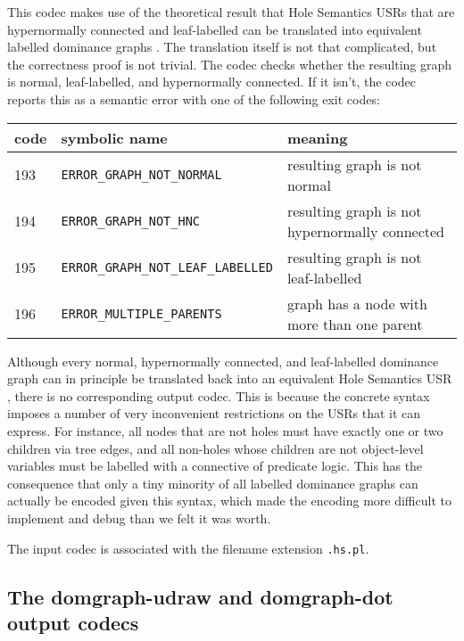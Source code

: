 This codec makes use of the theoretical result that Hole Semantics
USRs that are hypernormally connected and leaf-labelled can be
translated into equivalent labelled dominance graphs
\cite{KolNieTha03}. The translation itself is not that complicated,
but the correctness proof is not trivial. The codec checks whether the
resulting graph is normal, leaf-labelled, and hypernormally
connected. If it isn't, the codec reports this as a semantic error
with one of the following exit codes:

\begin{tabular}{lll}
code & symbolic name & meaning \\ \hline
193 &  \verb?ERROR_GRAPH_NOT_NORMAL? & resulting graph is not normal \\
194 &  \verb?ERROR_GRAPH_NOT_HNC? & resulting graph is not hypernormally
connected \\
195 &  \verb?ERROR_GRAPH_NOT_LEAF_LABELLED? & resulting graph is not
leaf-labelled \\
196 &  \verb?ERROR_MULTIPLE_PARENTS? & graph has a node with more than one
parent 
\end{tabular}

Although every normal, hypernormally connected, and leaf-labelled
dominance graph can in principle be translated back into an equivalent
Hole Semantics USR \cite{KolNieTha03}, there is no corresponding
output codec. This is because the concrete syntax imposes a number of
very inconvenient restrictions on the USRs that it can express. For
instance, all nodes that are not holes must have exactly one or two
children via tree edges, and all non-holes whose children are not
object-level variables must be labelled with a connective of predicate
logic. This has the consequence that only a tiny minority of all
labelled dominance graphs can actually be encoded given this syntax,
which made the encoding more difficult to implement and debug than we
felt it was worth.

The input codec is associated with the filename extension \verb?.hs.pl?.




\subsection{The domgraph-udraw and domgraph-dot output codecs}






